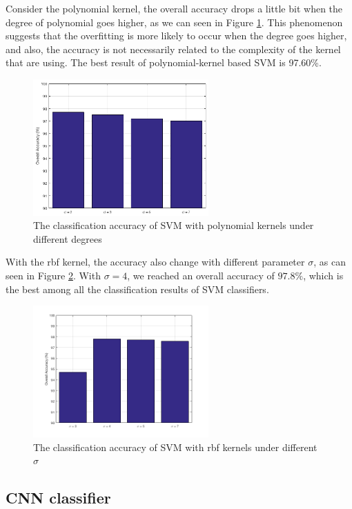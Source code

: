 \documentclass[12pt]{article}
\begin{document}
Consider the polynomial kernel, the overall accuracy drops a little bit when the degree of polynomial goes higher, as we can seen in Figure \ref{fig:svm-poly}. This phenomenon suggests that the overfitting is more likely to occur when the degree goes higher, and also, the accuracy is not necessarily related to the complexity of the kernel that are using. The best result of polynomial-kernel based SVM is 97.60\%.
\begin{figure}[tbp]
	\centering
	\includegraphics[width = 0.6\textwidth]{svm}		
	\caption{The classification accuracy of SVM with polynomial kernels under different degrees}
	\label{fig:svm-poly}
\end{figure}

With the rbf kernel, the accuracy also change with different parameter $\sigma$, as can seen in Figure \ref{fig:svm-rbf}. With $\sigma = 4$, we reached an overall accuracy of $97.8\%$, which is the best among all the classification results of SVM classifiers.

\begin{figure}[tbp]
	\centering
	\includegraphics[width = 0.6\textwidth]{svm-rbf}		
	\caption{The classification accuracy of SVM with rbf kernels under different $\sigma$}
	\label{fig:svm-rbf}
\end{figure}


\subsection{CNN classifier}
\end{document}
